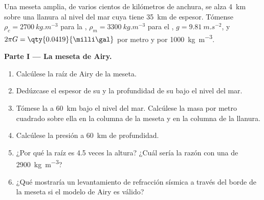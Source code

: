 \begin{problem}
\label{pb:b1:isostasy-gravity:1}
Una meseta amplia, de varios cientos de kilómetros de anchura, se alza \qty{4}{km} sobre una llanura al nivel del mar cuya 
tiene \qty{35}{km} de espesor. Tómense $\rho_c = \qty{2700}{kg.m^{-3}}$ para la , $\rho_m = \qty{3300}{kg.m^{-3}}$ para el
, $g = \qty{9.81}{m.s^{-2}}$, y $2\pi G = \qty{0.0419}{\milli\gal}$ por metro y por \qty{1000}{kg.m^{-3}}.

\medskip
\noindent\textbf{Parte I --- La meseta de Airy.}
\begin{enumerate}
  \item Calcúlese la raíz de Airy de la meseta.
  \item Dedúzcase el espesor de su  y la profundidad de su  bajo el nivel
        del mar.
  \item Tómese la  a \qty{60}{km} bajo el nivel del mar. Calcúlese la masa por metro cuadrado sobre ella
        en la columna de la meseta y en la columna de la llanura.
  \item Calcúlese la presión a \qty{60}{km} de profundidad.
  \item ¿Por qué la raíz es 4.5 veces la altura? ¿Cuál sería la razón con una  de \qty{2900}{kg.m^{-3}}?
  \item ¿Qué mostraría un levantamiento de refracción sísmica a través del borde de la meseta si el modelo de Airy es válido?
\end{enumerate}


\end{problem}
